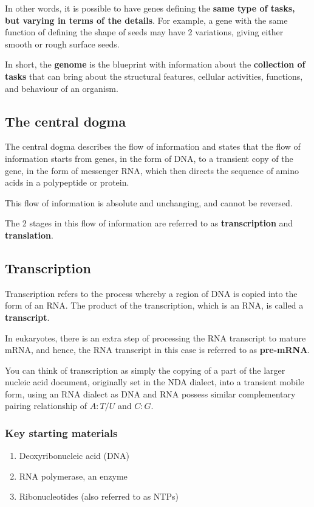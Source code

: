 \documentclass[11pt]{article}
\begin{document}
In other words, it is possible to have genes defining the \textbf{same type of tasks, but varying in terms of the details}. For example, a gene with the same function of defining the shape of seeds may have 2 variations, giving either smooth or rough surface seeds.


In short, the \textbf{genome} is the blueprint with information about the \textbf{collection of tasks} that can bring about the structural features, cellular activities, functions, and behaviour of an organism.
\subsection{The central dogma}
\label{sec:orgc5eed87}
The central dogma describes the flow of information and states that the flow of information starts from genes, in the form of DNA, to a transient copy of the gene, in the form of messenger RNA, which then directs the sequence of amino acids in a polypeptide or protein.


This flow of information is absolute and unchanging, and cannot be reversed.


The 2 stages in this flow of information are referred to as \textbf{transcription} and \textbf{translation}.

\newpage
\subsection{Transcription}
\label{sec:org9643be1}
Transcription refers to the process whereby a region of DNA is copied into the form of an RNA. The product of the transcription, which is an RNA, is called a \textbf{transcript}.


In eukaryotes, there is an extra step of processing the RNA transcript to mature mRNA, and hence, the RNA transcript in this case is referred to as \textbf{pre-mRNA}.


You can think of transcription as simply the copying of a part of the larger nucleic acid document, originally set in the NDA dialect, into a transient mobile form, using an RNA dialect as DNA and RNA possess similar complementary pairing relationship of \(A:T/U\) and \(C:G\).
\subsubsection{Key starting materials}
\label{sec:org5edf51c}
\begin{enumerate}
\item Deoxyribonucleic acid (DNA)
\item RNA polymerase, an enzyme
\item Ribonucleotides (also referred to as NTPs)
\end{enumerate}
\end{document}
